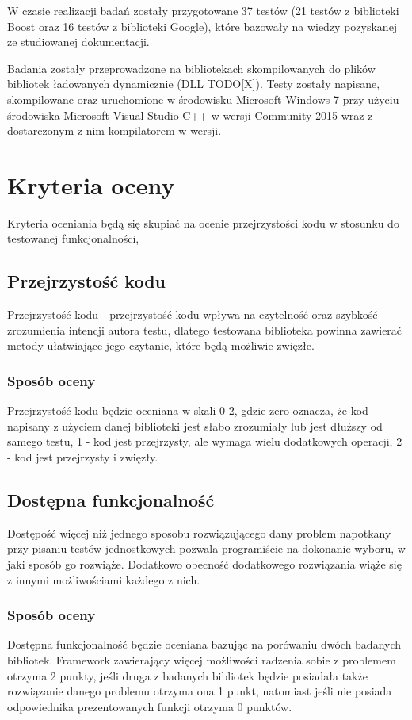 \documentclass[12pt,a4paper,notitlepage]{report}
\begin{document}
W czasie realizacji badań zostały przygotowane 37 testów (21 testów z biblioteki Boost oraz 16 testów z biblioteki Google), które bazowały na wiedzy pozyskanej ze studiowanej dokumentacji.

Badania zostały przeprowadzone na bibliotekach skompilowanych do plików bibliotek ładowanych dynamicznie (DLL TODO[X]). Testy zostały napisane, skompilowane oraz uruchomione w środowisku Microsoft Windows 7 przy użyciu środowiska Microsoft Visual Studio C++ w wersji Community 2015 wraz z dostarczonym z nim kompilatorem w wersji.

\chapter{Kryteria oceny}

Kryteria oceniania będą się skupiać na ocenie przejrzystości kodu w stosunku do testowanej funkcjonalności,

\section{Przejrzystość kodu}

Przejrzystość kodu - przejrzystość kodu wpływa na czytelność oraz szybkość zrozumienia intencji autora testu, dlatego testowana biblioteka powinna zawierać metody ułatwiające jego czytanie, które będą możliwie zwięzłe.

\subsection{Sposób oceny}
Przejrzystość kodu będzie oceniana w skali 0-2, gdzie zero oznacza, że kod napisany z użyciem danej biblioteki jest słabo zrozumiały lub jest dłuższy od samego testu, 1 - kod jest przejrzysty, ale wymaga wielu dodatkowych operacji, 2 - kod jest przejrzysty i zwięzły.

\section{Dostępna funkcjonalność}

Dostępość więcej niż jednego sposobu rozwiązującego dany problem napotkany przy pisaniu testów jednostkowych pozwala programiście na dokonanie wyboru, w jaki sposób go rozwiąże. Dodatkowo obecność dodatkowego rozwiązania wiąże się z innymi możliwościami każdego z nich.

\subsection{Sposób oceny}
Dostępna funkcjonalność będzie oceniana bazując na porówaniu dwóch badanych bibliotek. Framework zawierający więcej możliwości radzenia sobie z problemem otrzyma 2 punkty, jeśli druga z badanych bibliotek będzie posiadała także rozwiązanie danego problemu otrzyma ona 1 punkt, natomiast jeśli nie posiada odpowiednika prezentowanych funkcji otrzyma 0 punktów.
\end{document}
